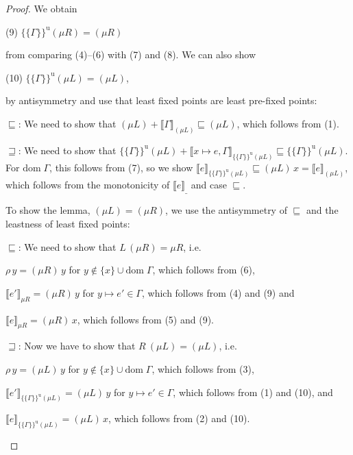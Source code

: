 \documentclass{jfp1}
\theoremstyle{nonumberbreak}
\newtheorem{proof}{Proof}
\newcommand{\dom}[1]{\text{dom}\;#1}
\newcommand{\dsem}[2]{\llbracket #1 \rrbracket_{#2}}
\newcommand{\esemu}[1]{\{\!\!\!\{#1\}\!\!\!\}^{\text{u}}}
\begin{document}
\begin{proof}
\medskip
We obtain
\begin{compactenum}[(1)]
\item[(9)] $\esemu{\Gamma}{(\mu R)} = (\mu R)$
\end{compactenum}
from comparing (4)--(6) with (7) and (8). We can also show
\begin{compactenum}[(1)]
\item[(10)] $\esemu{\Gamma}{(\mu L)} = (\mu L)$,
\end{compactenum}
by antisymmetry and use that least fixed points are least pre-fixed points:
\begin{compactitem}[$\sqsubseteq$:]
\item[$\sqsubseteq$:] We need to show that $(\mu L) + \dsem{\Gamma}{(\mu L)} \sqsubseteq (\mu L)$, which follows from (1). 
\item[$\sqsupseteq$:] We need to show that $\esemu{\Gamma}{(\mu L)} + \dsem{x\mapsto e, \Gamma}{\esemu{\Gamma}{(\mu L)}} \sqsubseteq \esemu{\Gamma}{(\mu L)}$. For $\dom\Gamma$, this follows from (7), so we show $\dsem{e}{\esemu{\Gamma}{(\mu L)}} \sqsubseteq (\mu L)\, x = \dsem{e}{(\mu L)}$, which follows from the monotonicity of $\dsem{e}{\_}$ and case $\sqsubseteq$.
\end{compactitem}

To show the lemma, $(\mu L) = (\mu R)$, we use the antisymmetry of $\sqsubseteq$ and the leastness of least fixed points:
\begin{compactitem}[$\sqsubseteq$:]
\item[$\sqsubseteq$:] We need to show that $L\, (\mu R) = \mu R$, i.e.
\begin{compactitem}
\item $\rho\,y = (\mu R)\, y$ for $y \notin \{x\}\cup \dom\Gamma$, which follows from (6),
\item $\dsem{e'}{\mu R} = (\mu R)\, y$ for $y \mapsto e' \in \Gamma$, which follows from (4) and (9) and
\item $\dsem{e}{\mu R} = (\mu R)\, x$, which follows from (5) and (9).
\end{compactitem}
\item[$\sqsupseteq$:] Now we have to show that $R\ (\mu L) = (\mu L)$, i.e.
\begin{compactitem}
\item $\rho\,y = (\mu L)\, y$ for $y \notin \{x\}\cup \dom\Gamma$, which follows from (3),
\item $\dsem{e'}{\esemu{\Gamma}{(\mu L)}} = (\mu L)\, y$ for $y \mapsto e' \in \Gamma$, which follows from (1) and (10), and
\item $\dsem{e}{\esemu{\Gamma}{(\mu L)}} = (\mu L)\, x$, which follows from (2) and (10).
\end{compactitem}
\end{compactitem}
\end{proof}
\end{document}
